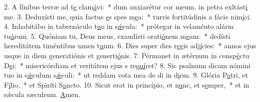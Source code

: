 2. A fínibus terræ ad t\uline{e} clam\uline{á}vi:~* dum anxiarétur cor meum, in petra exltást\uline{i} me.
3. Deduxísti me, quia factus \uline{e}s spes m\uline{e}a:~* turris fortitúdinis a fácie nim\uline{í}ci.
4. Inhabitábo in tabernáculo t\uline{u}o in s\uline{ǽ}cula:~* prótegar in velaménto alárm tu\uline{á}rum.
5. Quóniam tu, Deus meus, exaudísti orati\uline{ó}nem m\uline{e}am:~* dedísti hereditátem timéntibus nmen t\uline{u}um.
6. Dies super dies r\uline{e}gis adj\uline{í}cies:~* annos ejus usque in diem generatiónis et generti\uline{ó}nis.
7. Pérmanet in ætérnum in consp\uline{é}ctu D\uline{e}i:~* misericórdiam et veritátem ejus s re\uline{quí}ret?
8. Sic psalmum dicam nómini tuo in s\uline{ǽ}culum s\uline{ǽ}culi:~* ut reddam vota mea de di in d\uline{i}em.
9. Glória P\uline{a}tri, et F\uline{í}lio,~* et Spiríti S\uline{a}ncto.
10. Sicut erat in princípio, et n\uline{u}nc, et s\uline{e}mper,~* et in sǽcula sæculrum. \uline{A}men.
